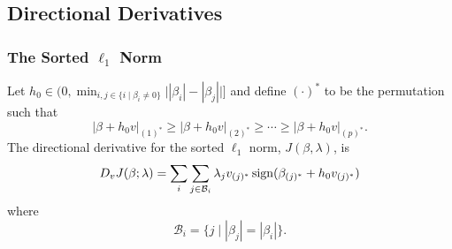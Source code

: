 \subsection{Directional Derivatives}%
\label{sec:directional-derivatives}

\subsubsection{The Sorted \texorpdfstring{\(\ell_1\)}{l1}
  Norm}

\begin{theorem}
  \label{thm:sl1-directional-derivative}
  Let \(h_0 \in \big(0, \min_{i,j \in \{i \mid \beta_i \neq 0\}}\big| |\beta_i| -
  |\beta_j| \big| \big]\) and define \((\cdot)^*\) to be the
  permutation such that
  \[
    |\beta + h_0v|_{(1)^*} \geq |\beta + h_0v |_{(2)^*}
    \geq \cdots \geq |\beta + h_0v|_{(p)^*}.
  \]
  The directional derivative for the sorted \(\ell_1\) norm, \(J(\beta,
  \lambda)\), is
  \[
    D_v J(\beta ; \lambda) =
    \sum_i \sum_{j \in \mathcal{B}_i} \lambda_j v_{(j)^*}\operatorname{sign}(\beta_{(j)^*} + h_0v_{(j)^*})\]
  where
  \[
    \mathcal{B}_i = \{j \mid |\beta_j| = |\beta_i|\}.
  \]
\end{theorem}
